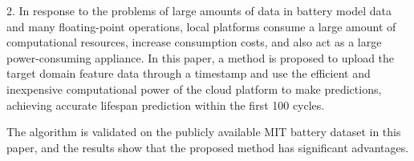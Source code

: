 \begin{enabstract}
      2. In response to the problems of large amounts of data in battery model data and many floating-point operations, local platforms consume a large amount of computational resources, increase consumption costs, and also act as a large power-consuming appliance. In this paper, a method is proposed to upload the target domain feature data through a timestamp and use the efficient and inexpensive computational power of the cloud platform to make predictions, achieving accurate lifespan prediction within the first 100 cycles.
      
      The algorithm is validated on the publicly available MIT battery dataset in this paper, and the results show that the proposed method has significant advantages.


\end{enabstract}
